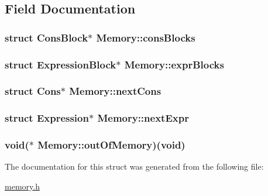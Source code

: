 \subsection{Field Documentation}
\hypertarget{structMemory_a6dd8fb1f5dec075eb20903d54642b877}{
\subsubsection[{cons\+Blocks}]{\setlength{\rightskip}{0pt plus 5cm}struct Cons\+Block$\ast$ Memory\+::cons\+Blocks}}\label{structMemory_a6dd8fb1f5dec075eb20903d54642b877}
\hypertarget{structMemory_acd214ac287290fab899a231d5641bc63}{
\subsubsection[{expr\+Blocks}]{\setlength{\rightskip}{0pt plus 5cm}struct {\bf Expression\+Block}$\ast$ Memory\+::expr\+Blocks}}\label{structMemory_acd214ac287290fab899a231d5641bc63}
\hypertarget{structMemory_ad2a150f5cb9c96d7b9323e50db5a921b}{
\subsubsection[{next\+Cons}]{\setlength{\rightskip}{0pt plus 5cm}struct Cons$\ast$ Memory\+::next\+Cons}}\label{structMemory_ad2a150f5cb9c96d7b9323e50db5a921b}
\hypertarget{structMemory_a588f224743248c7c430727d03aeb63f4}{
\subsubsection[{next\+Expr}]{\setlength{\rightskip}{0pt plus 5cm}struct Expression$\ast$ Memory\+::next\+Expr}}\label{structMemory_a588f224743248c7c430727d03aeb63f4}
\hypertarget{structMemory_ae4cdcc4cf5b157966779200389abd292}{
\subsubsection[{out\+Of\+Memory}]{\setlength{\rightskip}{0pt plus 5cm}void($\ast$  Memory\+::out\+Of\+Memory)(void)}}\label{structMemory_ae4cdcc4cf5b157966779200389abd292}


The documentation for this struct was generated from the following file\+:\begin{DoxyCompactItemize}
\item 
\hyperlink{memory_8h}{memory.\+h}\end{DoxyCompactItemize}

